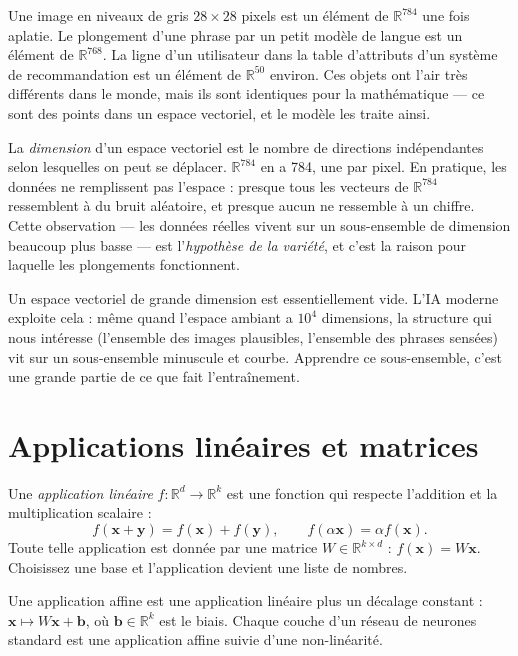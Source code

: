 \begin{example}
Une image en niveaux de gris $28 \times 28$ pixels est un élément de $\mathbb{R}^{784}$ une fois aplatie. Le plongement d'une phrase par un petit modèle de langue est un élément de $\mathbb{R}^{768}$. La ligne d'un utilisateur dans la table d'attributs d'un système de recommandation est un élément de $\mathbb{R}^{50}$ environ. Ces objets ont l'air très différents dans le monde, mais ils sont identiques pour la mathématique --- ce sont des points dans un espace vectoriel, et le modèle les traite ainsi.
\end{example}

La \emph{dimension} d'un espace vectoriel est le nombre de directions indépendantes selon lesquelles on peut se déplacer. $\mathbb{R}^{784}$ en a 784, une par pixel. En pratique, les données ne remplissent pas l'espace : presque tous les vecteurs de $\mathbb{R}^{784}$ ressemblent à du bruit aléatoire, et presque aucun ne ressemble à un chiffre. Cette observation --- les données réelles vivent sur un sous-ensemble de dimension beaucoup plus basse --- est l'\emph{hypothèse de la variété}, et c'est la raison pour laquelle les plongements fonctionnent.

\begin{intuition}
Un espace vectoriel de grande dimension est essentiellement vide. L'IA moderne exploite cela : même quand l'espace ambiant a $10^4$ dimensions, la structure qui nous intéresse (l'ensemble des images plausibles, l'ensemble des phrases sensées) vit sur un sous-ensemble minuscule et courbe. Apprendre ce sous-ensemble, c'est une grande partie de ce que fait l'entraînement.
\end{intuition}

\section{Applications linéaires et matrices}

Une \emph{application linéaire} $f: \mathbb{R}^d \to \mathbb{R}^k$ est une fonction qui respecte l'addition et la multiplication scalaire :
\[
f(\bm{x} + \bm{y}) = f(\bm{x}) + f(\bm{y}), \qquad f(\alpha \bm{x}) = \alpha f(\bm{x}).
\]
Toute telle application est donnée par une matrice $W \in \mathbb{R}^{k \times d}$ : $f(\bm{x}) = W \bm{x}$. Choisissez une base et l'application devient une liste de nombres.

\begin{definition}
Une application affine est une application linéaire plus un décalage constant : $\bm{x} \mapsto W \bm{x} + \bm{b}$, où $\bm{b} \in \mathbb{R}^k$ est le biais. Chaque couche d'un réseau de neurones standard est une application affine suivie d'une non-linéarité.
\end{definition}

